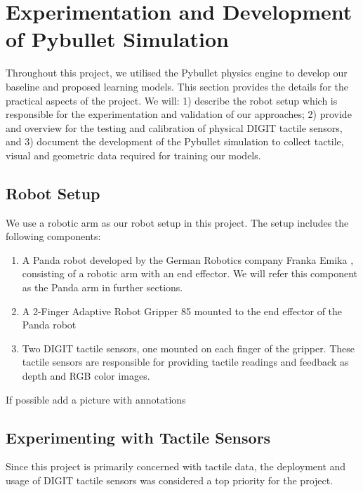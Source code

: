 \documentclass[11pt, a4paper]{report}
\theoremstyle{definition}
\begin{document}
\chapter{Experimentation and Development of Pybullet Simulation}
\label{chap:3}
Throughout this project, we utilised the Pybullet \cite{pybullet} physics engine to develop our baseline and proposed learning models. This section provides the details for the practical aspects of the project. We will: 1) describe the robot setup which is responsible for the experimentation and validation of our approaches; 2) provide and overview for the testing and calibration of physical DIGIT \cite{digit} tactile sensors, and 3) document the development of the Pybullet simulation to collect tactile, visual and geometric data required for training our models.

\section{Robot Setup}
\label{sec:3.1}
We use a robotic arm as our robot setup in this project. The setup includes the following components:
\begin{enumerate}
    \item A Panda robot developed by the German Robotics company Franka Emika \cite{franka}, consisting of a robotic arm with an end effector. We will refer this component as the Panda arm in further sections.
    \item A 2-Finger Adaptive Robot Gripper 85 \cite{robotiq} mounted to the end effector of the Panda robot
    \item Two DIGIT \cite{digit} tactile sensors, one mounted on each finger of the gripper. These tactile sensors are responsible for providing tactile readings and feedback as depth and RGB color images.
\end{enumerate}
{\color{red}If possible add a picture with annotations}


\section{Experimenting with Tactile Sensors}
\label{sec:3.2}
Since this project is primarily concerned with tactile data, the deployment and usage of DIGIT \cite{digit} tactile sensors was considered a top priority for the project.\\
\end{document}
